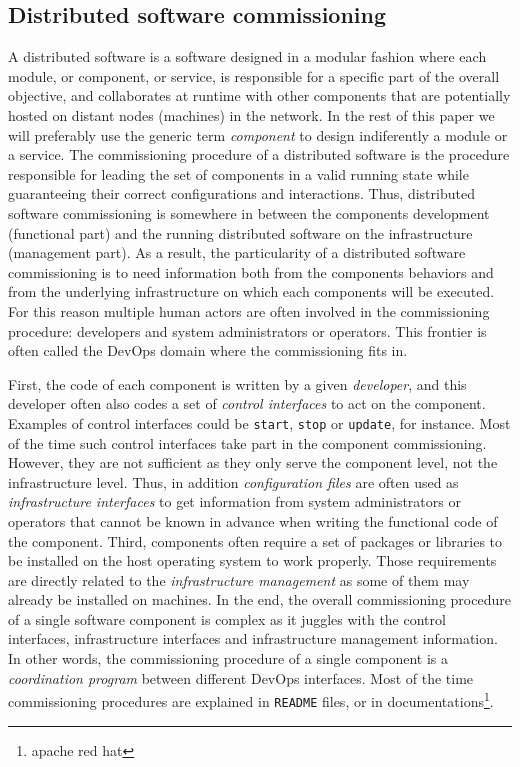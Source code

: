 
\subsection{Distributed software commissioning}

A distributed software is a software designed in a modular fashion
where each module, or component, or service, is responsible for a
specific part of the overall objective, and collaborates at runtime
with other components that are potentially hosted on distant nodes
(\ie machines) in the network. In the rest of this paper we will
preferably use the generic term \emph{component} to design
indiferently a module or a service.
%
The commissioning procedure of a distributed software is the procedure
responsible for leading the set of components in a valid running state
while guaranteeing their correct configurations and
interactions. Thus, distributed software commissioning is somewhere in
between the components development (functional part) and the running
distributed software on the infrastructure (management part). As a
result, the particularity of a distributed software commissioning is
to need information both from the components behaviors and from the
underlying infrastructure on which each components will be executed.
For this reason multiple human actors are often involved in the
commissioning procedure: developers and system administrators or
operators. This frontier is often called the DevOps domain where the
commissioning fits in.

First, the code of each component is written by a given
\emph{developer}, and this developer often also codes a set of
\emph{control interfaces} to act on the component. Examples of control
interfaces could be \texttt{start}, \texttt{stop} or \texttt{update},
for instance. Most of the time such control interfaces take part in
the component commissioning. However, they are not sufficient as they
only serve the component level, not the infrastructure level. Thus, in
addition \emph{configuration files} are often used as
\emph{infrastructure interfaces} to get information from system
administrators or operators that cannot be known in advance when
writing the functional code of the component. Third, components often
require a set of packages or libraries to be installed on the host
operating system to work properly. Those requirements are directly
related to the \emph{infrastructure management} as some of them may
already be installed on machines. In the end, the overall
commissioning procedure of a single software component is complex as
it juggles with the control interfaces, infrastructure interfaces and
infrastructure management information. In other words, the
commissioning procedure of a single component is a \emph{coordination
  program} between different DevOps interfaces. Most of the time
commissioning procedures are explained in \texttt{README} files, or in
documentations\footnote{apache red hat}.

